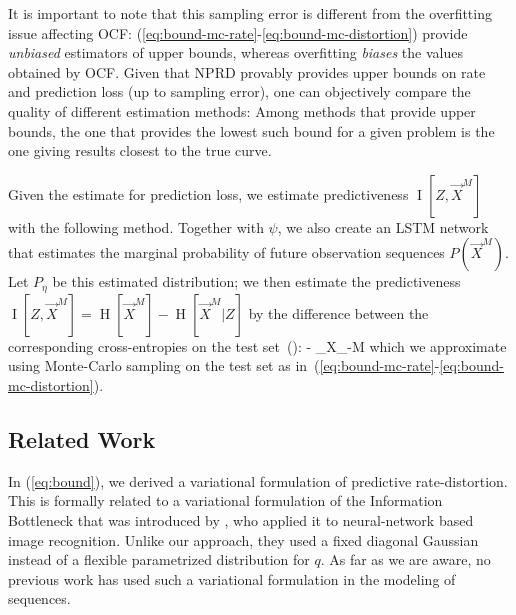\documentclass[entropy,article,submit,moreauthors,pdftex,10pt,a4paper]{Definitions/mdpi}
\newcommand{\finitefuture}{\overrightarrow{X}^{M}}
\newcommand{\finitepast}{^{-M}\overleftarrow{X}}%
\let\oldequation\equation
\let\oldendequation\endequation
\renewenvironment{equation}
  {\linenomathNonumbers\oldequation}
  {\oldendequation\endlinenomath}
\begin{document}
It is important to note that this sampling error is different from the overfitting issue affecting OCF: 
(\ref{eq:bound-mc-rate}-\ref{eq:bound-mc-distortion}) provide \emph{unbiased} estimators of upper bounds, whereas overfitting \emph{biases} the values obtained by OCF.
Given that NPRD provably provides upper bounds on rate and prediction loss (up to sampling error), one can objectively compare the quality of different estimation methods:
Among methods that provide upper bounds, the one that provides the lowest such bound for a given problem is the one giving results closest to the true curve.

Given the estimate for prediction loss, we estimate predictiveness $\operatorname{I}[Z, \finitefuture]$ with the following method.
Together with $\psi$, we also create an LSTM network that estimates the marginal probability of future observation sequences $P(\finitefuture)$. Let $P_\eta$ be this estimated distribution; we then estimate the predictiveness $\operatorname{I}[Z, \finitefuture] = \operatorname{H}[\finitefuture] - \operatorname{H}[\finitefuture|Z]$ by the difference between the corresponding cross-entropies on the test set~(\cite{mcallester2018formal}):
\begin{equation}\label{eq:bound-mc-predictiveness}
- _{X_{-M}}\left[\log P_\eta(\finitefuture) - P_\psi(\finitefuture | Z)\right]
\end{equation}
which we approximate using Monte-Carlo sampling on the test set as in~(\ref{eq:bound-mc-rate}-\ref{eq:bound-mc-distortion}).








\subsection{Related Work}
In (\ref{eq:bound}), we derived a variational formulation of predictive rate-distortion.
This is formally related to a variational formulation of the Information Bottleneck that was introduced by \cite{alemi-deep-2016}, who applied it to neural-network based image recognition.
Unlike our approach, they used a fixed diagonal Gaussian instead of a flexible parametrized distribution for $q$.
As far as we are aware, no previous work has used such a variational formulation in the modeling of sequences.
\end{document}
